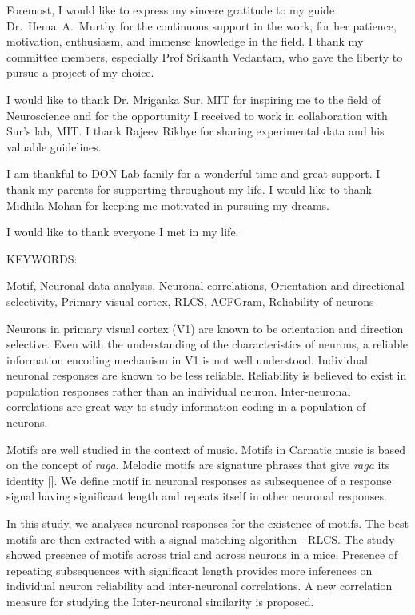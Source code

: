 \documentclass[MTech]{iitmdiss}
\begin{document}
Foremost, I would like to express my sincere gratitude to my guide Dr.~Hema~A.~Murthy for the continuous support in the work, for her patience, motivation, enthusiasm, and immense knowledge in the field. I thank my committee members, especially Prof Srikanth Vedantam, who gave the liberty to pursue a project of my choice.

I would like to thank Dr. Mriganka Sur, MIT for inspiring me to the field of Neuroscience and for the opportunity I received to work in collaboration with Sur's lab, MIT. I thank Rajeev Rikhye for sharing experimental data and his valuable guidelines.


I am thankful to DON Lab family for a wonderful time and great support. I thank my parents for supporting throughout my life. I would like to thank Midhila Mohan for keeping me motivated in pursuing my dreams.

I would like to thank everyone I met in my life.

\abstract
\noindent KEYWORDS: \hspace*{0.5em} \parbox[t]{4.4in}{Motif, Neuronal data analysis, Neuronal correlations, Orientation and directional selectivity, Primary visual cortex, RLCS, ACFGram, Reliability of neurons}
\vspace*{24pt}

Neurons in primary visual cortex (V1) are known to be orientation and direction selective. Even with the understanding of the characteristics of neurons, a reliable information encoding mechanism in V1 is not well understood. Individual neuronal responses are known to be less reliable. Reliability is believed to exist in population responses rather than an individual neuron. Inter-neuronal correlations are great way to study information coding in a population of neurons. 

Motifs are well studied in the context of music. Motifs in Carnatic music is based on the concept of \textit{raga}. Melodic motifs are signature phrases that give \textit{raga} its identity [\cite{ishwar2013motif}]. We define motif in neuronal responses as subsequence of a response signal having significant length and repeats itself in other neuronal responses. 

In this study, we analyses neuronal responses for the existence of motifs. The best motifs are then extracted with a signal matching algorithm - RLCS. The study showed presence of motifs across trial and across neurons in a mice. Presence of repeating subsequences with significant length provides more inferences on individual neuron reliability and inter-neuronal correlations. A new correlation measure for studying the Inter-neuronal similarity is proposed.
\end{document}
